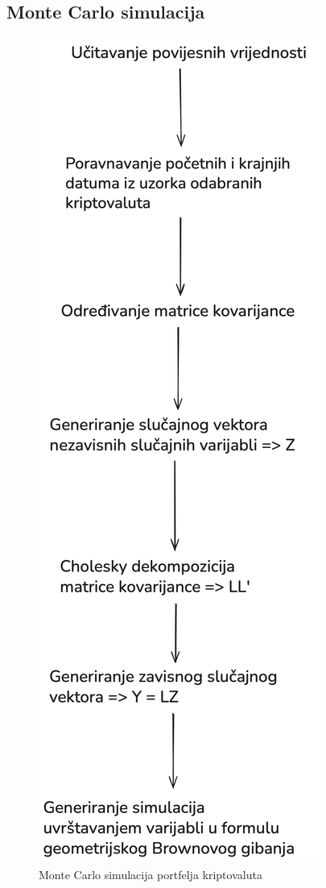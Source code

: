 \documentclass[zavrsnirad, upload]{fer}
\begin{document}
\subsection{Monte Carlo simulacija}
\label{sek:monte_carlo_simulacija}
\begin{figure}[H]
    \centering
    \includegraphics[height=0.7\textheight, keepaspectratio]{Figures/Monte_Carlo_explanation.png}
    \caption{Monte Carlo simulacija portfelja kriptovaluta}
    \label{fig:monte_carlo}
\end{figure}
\end{document}
